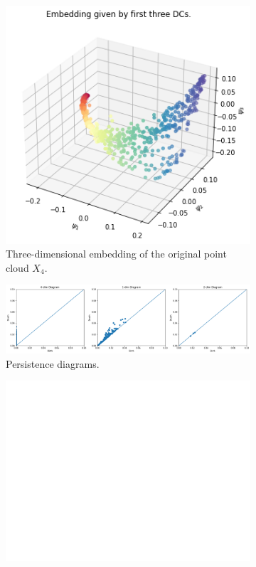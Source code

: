 \begin{figure}[H]
\centering
\begin{subfigure}[b]{0.2\textwidth}
    \includegraphics[width=\textwidth]{figures/topology/X4_embedding.png}
    \caption{Three-dimensional embedding of the original point cloud $X_4$.}
\end{subfigure}
\hfill
\begin{subfigure}[b]{0.75\textwidth}
    \includegraphics[width=\textwidth]{figures/topology/X4_H0.png}
    \caption{Persistence diagrams.}
\end{subfigure}
\begin{subfigure}[b]{0.25\textwidth}
\includegraphics[width=\textwidth]{figures/topology/white.png} 

\end{subfigure}
\end{figure}
